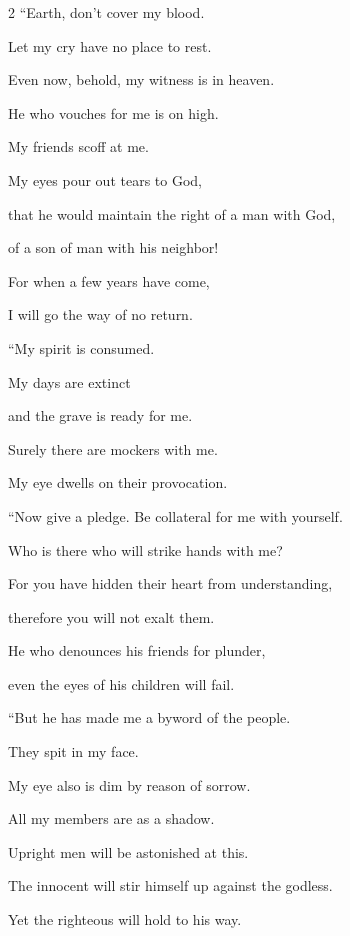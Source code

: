 \begin{multicols}{2}
	\myverse{}“Earth, don’t cover my blood.
	
	Let my cry have no place to rest.
	
	\myverse{}Even now, behold, my witness is in heaven.
	
	He who vouches for me is on high.
	
	\myverse{}My friends scoff at me.
	
	My eyes pour out tears to God,
	
	\myverse{}that he would maintain the right of a man with God,
	
	of a son of man with his neighbor!
	
	\myverse{}For when a few years have come,
	
	I will go the way of no return.
	
	
	
	\mychapter{} \myverse*{}“My spirit is consumed.
	
	\quad\quad My days are extinct
	
	and the grave is ready for me.
	
	\myverse{}Surely there are mockers with me.
	
	My eye dwells on their provocation.
	
	\vspace{\baselineskip}
	
	\myverse{}“Now give a pledge. Be collateral for me with yourself.
	
	Who is there who will strike hands with me?
	
	\myverse{}For you have hidden their heart from understanding,
	
	therefore you will not exalt them.
	
	\myverse{}He who denounces his friends for plunder,
	
	even the eyes of his children will fail.
	
	\vspace{\baselineskip}
	
	\myverse{}“But he has made me a byword of the people.
	
	They spit in my face.
	
	\myverse{}My eye also is dim by reason of sorrow.
	
	All my members are as a shadow.
	
	\myverse{}Upright men will be astonished at this.
	
	The innocent will stir himself up against the godless.
	
	\myverse{}Yet the righteous will hold to his way.
	

\end{multicols}
